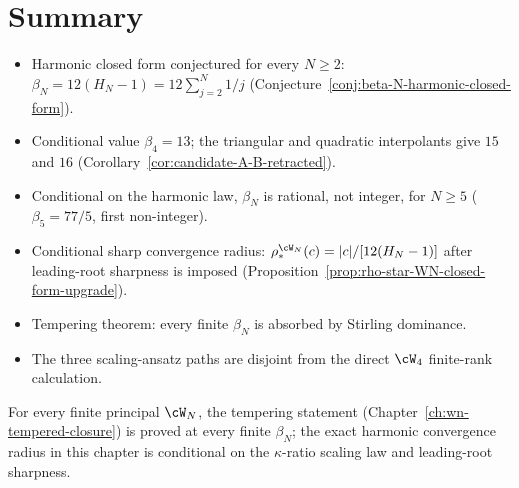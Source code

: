 \section{Summary}
\label{sec:beta-N-summary}

\begin{itemize}[nosep]
\item Harmonic closed form conjectured for every $N \ge 2$:
 $\beta_N = 12(H_N - 1) = 12 \sum_{j=2}^{N} 1/j$
 (Conjecture~\ref{conj:beta-N-harmonic-closed-form}).
\item Conditional value $\beta_4 = 13$; the triangular and quadratic interpolants give
 $15$ and $16$
 (Corollary~\ref{cor:candidate-A-B-retracted}).
\item Conditional on the harmonic law, $\beta_N$ is rational, not integer, for $N \ge 5$ ($\beta_5 = 77/5$,
 first non-integer).
\item Conditional sharp convergence radius:
 $\rho_*^{\cW_N}(c) = |c|/[12(H_N - 1)]$
 after leading-root sharpness is imposed
 (Proposition~\ref{prop:rho-star-WN-closed-form-upgrade}).
\item Tempering theorem: every finite $\beta_N$ is absorbed by
 Stirling dominance.
\item The three scaling-ansatz paths are disjoint from the direct
 $\cW_4$ finite-rank calculation.
\end{itemize}

For every finite principal $\cW_N$, the tempering statement
(Chapter~\ref{ch:wn-tempered-closure}) is proved at every finite
$\beta_N$; the exact harmonic convergence radius in this chapter is
conditional on the $\kappa$-ratio scaling law and leading-root
sharpness.
